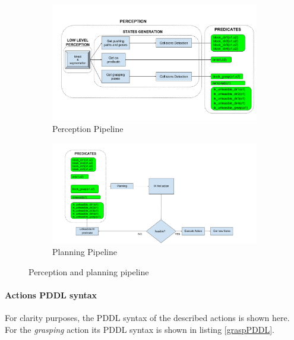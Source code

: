 \begin{figure}[tb]

\centering
\begin{subfigure}[t]{\textwidth}
\centering
\includegraphics[width=\textwidth]{Img/planning/Pipeline1.png}
\caption{Perception Pipeline}\label{fig:pipeline1}
\end{subfigure}
\begin{subfigure}[t]{\textwidth}
\centering
\includegraphics[width=\textwidth]{Img/planning/Pipeline2.png}
\caption{Planning Pipeline}\label{fig:pipeline2}
\end{subfigure}
\caption{Perception and planning pipeline}\label{fig:pipeline}
\end{figure}

\paragraph{Actions PDDL syntax}
For clarity purposes, the PDDL syntax of the described actions is shown here. 
For the \textit{grasping} action its PDDL syntax is shown in listing \ref{graspPDDL}.

